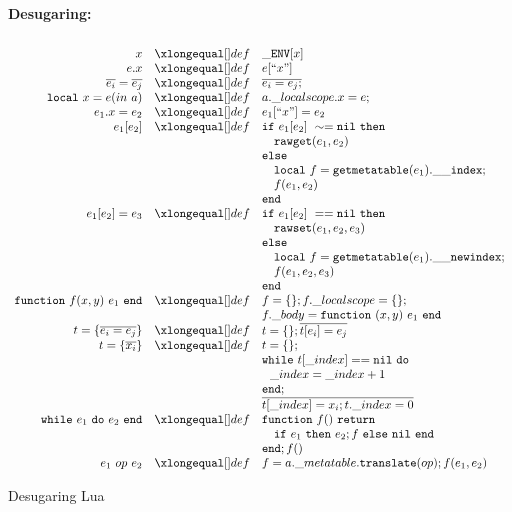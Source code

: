 \begin{figure}[P]
\caption{Desugaring Lua}
{\bf Desugaring:}
\label{fig:desLua}
\[
\begin{array}{rclcl}
\\

\desugar{x}{{\tt \_ENV}[x]}
\desugar{e.x}{e[``x"]}
\desugar{\overline{e_i}=\overline{e_j}}{\overline{e_i = e_j;}}
\desugar{{\tt local}~x=e(in~a)}{a.\_localscope.x = e;}
\desugar{e_1.x=e_2}{e_1[``x"] = e_2}
\desugar{e_1[e_2]}{{\tt if}~ e_1[e_2] ~\sim= {\tt nil} ~ {\tt then}\\}
\desugarline{ 
     \quad{\tt rawget}(e_1, e_2) ~\\
     {\tt else}\\
     \quad{\tt local}~f = {\tt getmetatable}(e_1).{\tt{\_}{\_}index};\\
     \quad f(e_1,e_2)\\ 
     {\tt end}\\
}
\desugar{e_1[e_2]=e_3}{
    {\tt if}~ e_1[e_2] ~== {\tt nil} ~ {\tt then}\\
}
\desugarline{  
     \quad{\tt rawset}(e_1, e_2,e_3) ~\\
     {\tt else}\\
     \quad{\tt local}~f = {\tt getmetatable}(e_1).{\tt{\_}{\_}newindex};\\
     \quad f(e_1,e_2,e_3)\\ 
     {\tt end}\\
 
}
\desugar{{\tt function}~f(x,y)~e_1~{\tt end}}{f = \{\}; f.\_localscope = \{\};}
\desugarline{f.\_body = {\tt function}~(x,y)~e_1~{\tt end}}
\desugar{t = \{\overline{e_i = e_j}\}}{t = \{\}; \overline{t[e_i]=e_j}}
\desugar{t = \{\overline{x_i}\}}{t = \{\};}
\desugarline{ {\tt while}~t[\_index] == {\tt nil~do}}
\desugarline{ ~~\_index = \_index + 1~ }
\desugarline{{\tt end};}
\desugarline{ \overline{t[\_index] = x_i; t.\_index = 0}}

\desugar{{\tt while}~e_1~{\tt do}~e_2~{\tt end}}{
    {\tt function}~f()~{\tt return}
}
\desugarline{ \quad{\tt if}~e_1~{\tt then}~e_2;f~{\tt else}~{\tt nil}~{\tt end}\\
{\tt end};f()
}
\desugar{
    e_1~ op ~e_2
}{
    f = a.\_metatable.{\tt translate}(op); f(e_1, e_2)
}
\end{array}\]
\end{figure}







